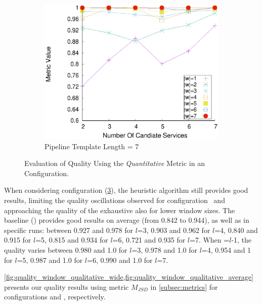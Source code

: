 \begin{figure}[ht!]
\begin{subfigure}{0.49\textwidth}
        \label{fig:quality_window_average_perce_n6}
      \end{subfigure}
      \hfill
      \begin{subfigure}{0.49\textwidth}
        \includegraphics[width=\textwidth]{Images/graphs/window_quality_performance_diff_perce_n7_s7_50_89_n7}
        \caption{Pipeline Template Length = 7}
        \label{fig:quality_window_average_perce_n7}
      \end{subfigure}


      \caption{Evaluation of Quality Using the \emph{Quantitative} Metric in an \average Configuration.}  \label{fig:quality_window_perce_average}

    \end{figure}

    When considering configuration \average (\cref{fig:quality_window_perce_average}), the heuristic algorithm still provides good results, limiting the quality oscillations observed for configuration \wide\ and approaching the quality of the exhaustive also for lower window sizes. The baseline () provides good results on average (from 0.842 to 0.944), as well as in specific runs: between 0.927 and 0.978 for $l$=3, 0.903 and 0.962 for $l$=4, 0.840 and 0.915 for $l$=5, 0.815 and 0.934 for $l$=6, 0.721 and 0.935 for $l$=7.
    When \windowsize=$l$-1, the quality varies between 0.980 and 1.0 for $l$=3, 0.978 and 1.0 for $l$=4, 0.954 and 1 for $l$=5, 0.987 and 1.0 for $l$=6, 0.990 and 1.0 for $l$=7.

    \cref{fig:quality_window_qualitative_wide,fig:quality_window_qualitative_average} {\color{OurColor2}presents} our quality results using metric $M_{JSD}$ in \cref{subsec:metrics} for configurations \wide and \average, respectively.


